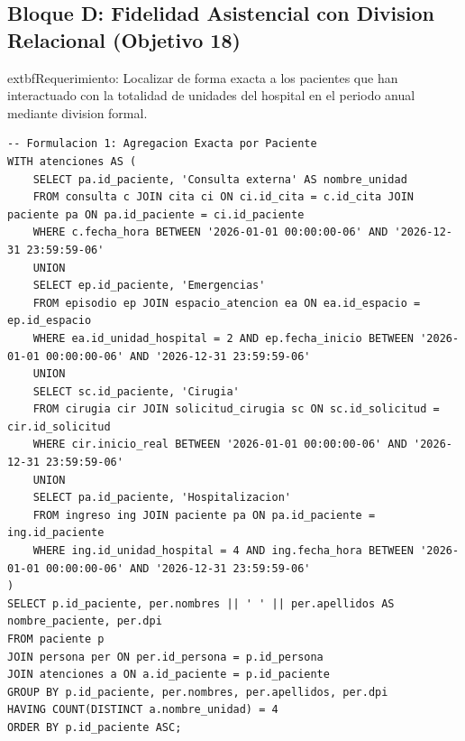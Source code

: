 \documentclass[11pt,a4paper]{article}
\begin{document}
\subsection{Bloque D: Fidelidad Asistencial con Division Relacional (Objetivo 18)}
	extbf{Requerimiento:} Localizar de forma exacta a los pacientes que han interactuado con la totalidad de unidades del hospital en el periodo anual mediante division formal.
\begin{lstlisting}[style=sqlstyle]
-- Formulacion 1: Agregacion Exacta por Paciente
WITH atenciones AS (
    SELECT pa.id_paciente, 'Consulta externa' AS nombre_unidad
    FROM consulta c JOIN cita ci ON ci.id_cita = c.id_cita JOIN paciente pa ON pa.id_paciente = ci.id_paciente
    WHERE c.fecha_hora BETWEEN '2026-01-01 00:00:00-06' AND '2026-12-31 23:59:59-06'
    UNION
    SELECT ep.id_paciente, 'Emergencias'
    FROM episodio ep JOIN espacio_atencion ea ON ea.id_espacio = ep.id_espacio
    WHERE ea.id_unidad_hospital = 2 AND ep.fecha_inicio BETWEEN '2026-01-01 00:00:00-06' AND '2026-12-31 23:59:59-06'
    UNION
    SELECT sc.id_paciente, 'Cirugia'
    FROM cirugia cir JOIN solicitud_cirugia sc ON sc.id_solicitud = cir.id_solicitud
    WHERE cir.inicio_real BETWEEN '2026-01-01 00:00:00-06' AND '2026-12-31 23:59:59-06'
    UNION
    SELECT pa.id_paciente, 'Hospitalizacion'
    FROM ingreso ing JOIN paciente pa ON pa.id_paciente = ing.id_paciente
    WHERE ing.id_unidad_hospital = 4 AND ing.fecha_hora BETWEEN '2026-01-01 00:00:00-06' AND '2026-12-31 23:59:59-06'
)
SELECT p.id_paciente, per.nombres || ' ' || per.apellidos AS nombre_paciente, per.dpi
FROM paciente p
JOIN persona per ON per.id_persona = p.id_persona
JOIN atenciones a ON a.id_paciente = p.id_paciente
GROUP BY p.id_paciente, per.nombres, per.apellidos, per.dpi
HAVING COUNT(DISTINCT a.nombre_unidad) = 4
ORDER BY p.id_paciente ASC;
\end{lstlisting}
\end{document}
